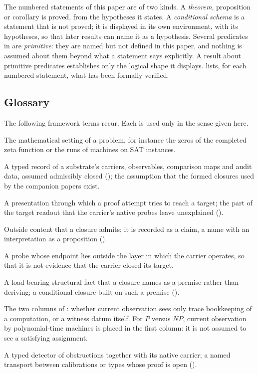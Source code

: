 The numbered statements of this paper are of two kinds.  A
\emph{theorem}, proposition or corollary is proved, from the hypotheses
it states.  A \emph{conditional schema} is a statement that is not
proved; it is displayed in its own environment, with its hypotheses, so
that later results can name it as a hypothesis.  Several predicates in
 are \emph{primitive}: they are
named but not defined in this paper, and nothing is assumed about them
beyond what a statement says explicitly.  A result about primitive
predicates establishes only the logical shape it displays.
 lists, for each numbered statement, what has
been formally verified.

\subsection{Glossary}\label{sec:glossary}

The following framework terms recur.  Each is used only in the sense
given here.

\begin{description}[leftmargin=1.5em,style=nextline,itemsep=2pt]
\item[Substrate.] The mathematical setting of a problem, for instance
  the zeros of the completed zeta function or the runs of machines on
  SAT instances.
\item[Formed closure; SB closure assumption.] A typed record of a
  substrate's carriers, observables, comparison maps and audit data,
  assumed admissibly closed (); the
  assumption that the formed closures used by the companion papers
  exist.
\item[Carrier; residual.] A presentation through which a proof attempt
  tries to reach a target; the part of the target readout that the
  carrier's native probes leave unexplained
  ().
\item[Accepted import; claim.] Outside content that a closure admits; it
  is recorded as a claim, a name with an interpretation as a
  proposition ().
\item[Layer-dissolving probe.] A probe whose endpoint lies outside the
  layer in which the carrier operates, so that it is not evidence that
  the carrier closed its target.
\item[Recognition source; recognition-mode landing.] A load-bearing
  structural fact that a closure names as a premise rather than
  deriving; a conditional closure built on such a premise
  ().
\item[Trace-state-only; witness-content-exposing.] The two columns of
  : whether current observation sees only
  trace bookkeeping of a computation, or a witness datum itself.  For
  \(P\) versus \(NP\), current observation by polynomial-time machines
  is placed in the first column: it is not assumed to see a satisfying
  assignment.
\item[Calibration; functorial gate.] A typed detector of obstructions
  together with its native carrier; a named transport between
  calibrations or types whose proof is open ().
\end{description}
